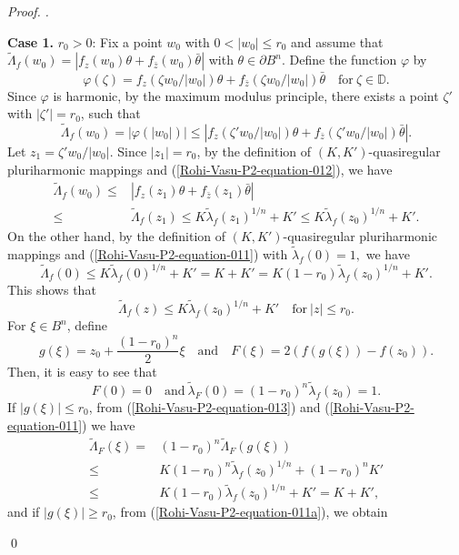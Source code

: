 \documentclass[a4paper,12pt,reqno]{amsart}
\theoremstyle{plain}
\theoremstyle{definition}
\newenvironment{pf}[1][]{%
	\vskip 3mm
	\noindent
	\ifthenelse{\equal{#1}{}}%
	{{\slshape Proof. }}%
	{{\slshape #1.} }%
}%
{\qed\bigskip}
\newcommand{\ID}{{\mathbb D}}
\numberwithin{equation}{section}
\begin{document}
\begin{pf}
\textbf{Case 1.} $r_0>0$: Fix a point $w_0$ with $0<|w_0|\leq r_0$ and assume that $\widetilde{\Lambda}_f(w_0)=|f_z(w_0)\theta+f_{\bar{z}}(w_0)\bar{\theta}|$ with $\theta\in \partial B^n.$ Define the function $\varphi$ by $$\varphi(\zeta)=f_z(\zeta w_0/|w_0|)\theta + f_{\bar{z}}(\zeta w_0/|w_0|)\bar{\theta} \quad \text{for}\ \zeta\in \ID.$$
Since $\varphi$ is harmonic, by the maximum modulus principle, there exists a point $\zeta'$ with $|\zeta'|=r_0$, such that 
   $$\widetilde{\Lambda}_f(w_0)=|\varphi(|w_0|)|\leq |f_z({\zeta' w_0}/{|w_0|})\theta+f_{\bar{z}}({\zeta' w_0}/{|w_0|})\bar{\theta}|. $$
Let $z_1=\zeta'w_0/|w_0|.$ Since $|z_1|=r_0$, by the definition of $(K,K')$-quasiregular pluriharmonic mappings and (\ref{Rohi-Vasu-P2-equation-012}), we have
 $$
 \begin{aligned}
   \widetilde{\Lambda}_f(w_0)\leq & \left|f_z(z_1)\theta+f_{\bar{z}}(z_1)\bar{\theta}\right|\\
    \leq & \widetilde{\Lambda}_f(z_1)\leq K\widetilde{\lambda}_f(z_1)^{1/n}+K'\leq  K\widetilde{\lambda}_f(z_0)^{1/n}+K'.
 \end{aligned} 
 $$ 
On the other hand, by the definition of $(K,K')$-quasiregular pluriharmonic mappings and (\ref{Rohi-Vasu-P2-equation-011}) with $\widetilde{\lambda}_f(0)=1,$ we have
  $$\widetilde{\Lambda}_f(0)\leq K\widetilde{\lambda}_f(0)^{1/n}+K'=K+K'=K(1-r_0)\widetilde{\lambda}_f(z_0)^{1/n}+K'.$$
This shows that 
\begin{equation}\label{Rohi-Vasu-P2-equation-013}
   \widetilde{\Lambda}_f(z)\leq  K\widetilde{\lambda}_f(z_0)^{1/n}+K' \quad \text{for} \ |z|\leq r_0.
\end{equation}
For $\xi \in B^n$, define
\begin{equation}\label{Rohi-Vasu-P2-equation-013a}
g(\xi)=z_0+\frac{(1-r_0)^n}{2}\xi \quad \text{and}\quad F(\xi)=2\left(f(g(\xi))-f(z_0)\right).
\end{equation} 
Then, it is easy to see that $$F(0)=0 \quad \text{and}\ \widetilde{\lambda}_F(0)=(1-r_0)^n \widetilde{\lambda}_f(z_0)=1.$$
If $|g(\xi)|\leq r_0$, from (\ref{Rohi-Vasu-P2-equation-013}) and (\ref{Rohi-Vasu-P2-equation-011}) we have
$$
\begin{aligned}
\widetilde{\Lambda}_F(\xi) = & (1-r_0)^n \widetilde{\Lambda}_F(g(\xi)) \\
\leq &  K(1-r_0)^n\widetilde{\lambda}_f(z_0)^{1/n}+(1-r_0)^nK'\\
\leq & K(1-r_0)\widetilde{\lambda}_f(z_0)^{1/n}+K'=K+K',
\end{aligned}
$$
and if $|g(\xi)|\geq r_0$, from (\ref{Rohi-Vasu-P2-equation-011a}), we obtain

\end{pf}
\end{document}
